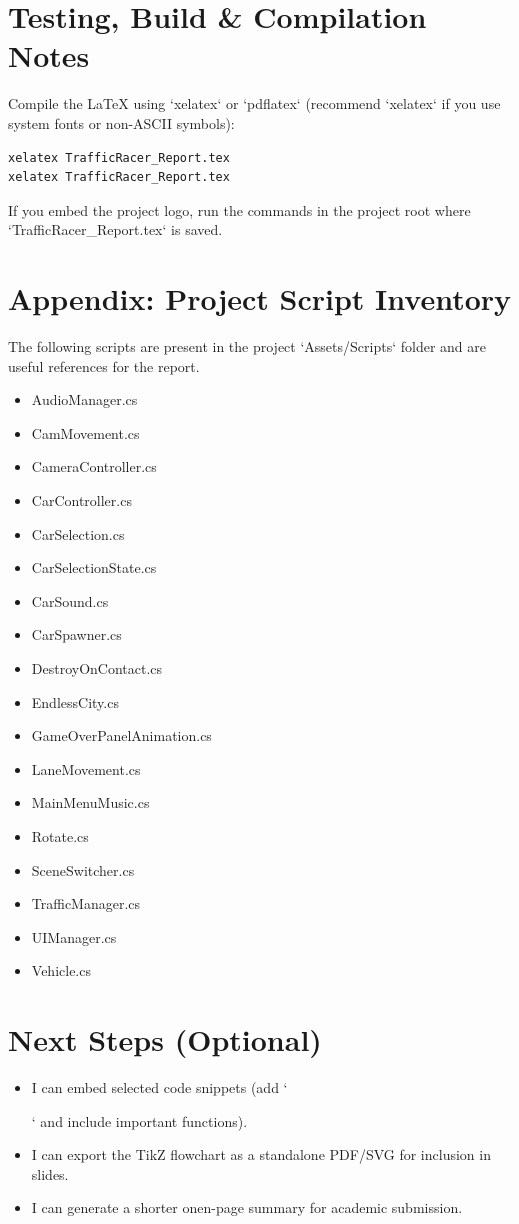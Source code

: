 \documentclass[12pt, a4paper]{article}
\begin{document}
\section{Testing, Build \& Compilation Notes}
Compile the LaTeX using `xelatex` or `pdflatex` (recommend `xelatex` if you use system fonts or non-ASCII symbols):
\begin{verbatim}
xelatex TrafficRacer_Report.tex
xelatex TrafficRacer_Report.tex
\end{verbatim}

If you embed the project logo, run the commands in the project root where `TrafficRacer_Report.tex` is saved.

\section{Appendix: Project Script Inventory}
The following scripts are present in the project `Assets/Scripts` folder and are useful references for the report.
\begin{itemize}
  \item AudioManager.cs
  \item CamMovement.cs
  \item CameraController.cs
  \item CarController.cs
  \item CarSelection.cs
  \item CarSelectionState.cs
  \item CarSound.cs
  \item CarSpawner.cs
  \item DestroyOnContact.cs
  \item EndlessCity.cs
  \item GameOverPanelAnimation.cs
  \item LaneMovement.cs
  \item MainMenuMusic.cs
  \item Rotate.cs
  \item SceneSwitcher.cs
  \item TrafficManager.cs
  \item UIManager.cs
  \item Vehicle.cs
\end{itemize}

\section{Next Steps (Optional)}
\begin{itemize}
  \item I can embed selected code snippets (add `\usepackage{listings}` and include important functions).
  \item I can export the TikZ flowchart as a standalone PDF/SVG for inclusion in slides.
  \item I can generate a shorter onen-page summary for academic submission.
\end{itemize}
\end{document}
